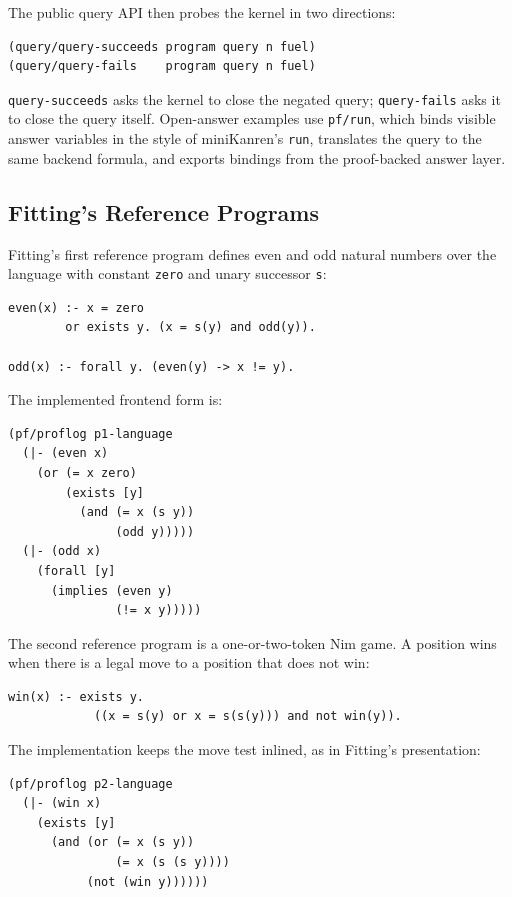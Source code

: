 \documentclass[acmsmall,screen,review,anonymous]{acmart}
\begin{document}
The public query API then probes the kernel in two directions:

\begin{verbatim}
(query/query-succeeds program query n fuel)
(query/query-fails    program query n fuel)
\end{verbatim}

\texttt{query-succeeds} asks the kernel to close the negated query;
\texttt{query-fails} asks it to close the query itself.  Open-answer examples
use \texttt{pf/run}, which binds visible answer variables in the style of
miniKanren's \texttt{run}, translates the query to the same backend formula,
and exports bindings from the proof-backed answer layer.

\subsection{Fitting's Reference Programs}

Fitting's first reference program defines even and odd natural numbers over the
language with constant \texttt{zero} and unary successor \texttt{s}:

\begin{verbatim}
even(x) :- x = zero
        or exists y. (x = s(y) and odd(y)).

odd(x) :- forall y. (even(y) -> x != y).
\end{verbatim}

The implemented frontend form is:

\begin{verbatim}
(pf/proflog p1-language
  (|- (even x)
    (or (= x zero)
        (exists [y]
          (and (= x (s y))
               (odd y)))))
  (|- (odd x)
    (forall [y]
      (implies (even y)
               (!= x y)))))
\end{verbatim}

The second reference program is a one-or-two-token Nim game.  A position wins
when there is a legal move to a position that does not win:

\begin{verbatim}
win(x) :- exists y.
            ((x = s(y) or x = s(s(y))) and not win(y)).
\end{verbatim}

The implementation keeps the move test inlined, as in Fitting's presentation:

\begin{verbatim}
(pf/proflog p2-language
  (|- (win x)
    (exists [y]
      (and (or (= x (s y))
               (= x (s (s y))))
           (not (win y))))))
\end{verbatim}
\end{document}
